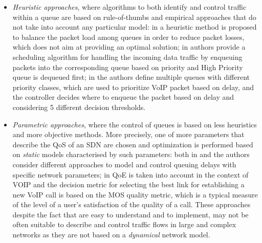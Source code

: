 \begin{itemize}
  \item \textit{Heuristic approaches}, where algorithms to both identify and control traffic within a queue are based on rule-of-thumbs and empirical approaches that do not take into account any particular model: in \cite{Boero2016} a heuristic method is proposed to balance the packet load among queues in order to reduce packet losses, which does not aim at providing an optimal solution; in \cite{Umadevi} authors provide a scheduling algorithm for handling the incoming data traffic by enqueuing packets into the corresponding queue based on priority and High Priority queue is dequeued first; in \cite{Olariu} the authors define multiple queues with different priority classes, which are used to prioritize VoIP packet based on delay, and the controller decides where to enqueue the packet based on delay and considering 5 different decision thresholds.
  
  \item \textit{Parametric approaches}, where the control of queues is based on less heuristics and more objective methods. More precisely, one of more parameters that describe the QoS of an SDN are chosen and optimization is performed based on \textit{static} models characterised by such parameters: both in \cite{Haiyan} and \cite{ChenWang} the authors consider different approaches to model and control queuing delays with specific network parameters; in \cite{Najjar} QoE is taken into account in the context of VOIP and the decision metric for selecting the best link for establishing a new VoIP call is based on the MOS quality metric, which is a typical measure of the level of a user's satisfaction of the quality of a call. These approaches despite the fact that are easy to understand and to implement, may not be often suitable to describe and control traffic flows in large and complex networks as they are not based on a \textit{dynamical} network model.
  

\end{itemize}
